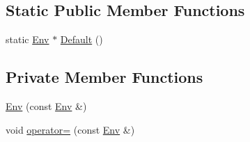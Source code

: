 \subsection*{Static Public Member Functions}
\begin{DoxyCompactItemize}
\item 
static \hyperlink{classleveldb_1_1_env}{Env} $\ast$ \hyperlink{classleveldb_1_1_env_ae15b67e650ff6790059745fd1b3bf3e7}{Default} ()
\end{DoxyCompactItemize}
\subsection*{Private Member Functions}
\begin{DoxyCompactItemize}
\item 
\hyperlink{classleveldb_1_1_env_a1a9edfb174a3553c8144612f5da6353e}{Env} (const \hyperlink{classleveldb_1_1_env}{Env} \&)
\item 
void \hyperlink{classleveldb_1_1_env_a0b99df952aed4c5630945b68ce0e011e}{operator=} (const \hyperlink{classleveldb_1_1_env}{Env} \&)
\end{DoxyCompactItemize}


